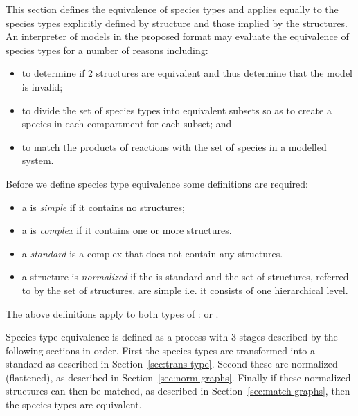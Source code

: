 \documentclass{cekarticle}
\begin{document}
This section defines the equivalence of species types and applies
equally to the species types explicitly defined by
 structure and those implied by the
 structures.  An interpreter of models in the
proposed format may evaluate the equivalence of species types for
a number of reasons including:

\begin{itemize}

\item to determine if 2  structures are equivalent
and thus determine that the model is invalid;

\item to divide the set of species types into equivalent subsets
so as to create a species in each compartment for each subset; and

\item to match the products of reactions with the set of species
in a modelled system.

\end{itemize}

Before we define species type equivalence some definitions are
required:

\begin{itemize}

\item a  is \emph{simple} if it contains no
 structures;

\item a  is \emph{complex} if it contains one
or more  structures.

\item a \emph{standard}  is a complex
 that does not contain any 
structures.

\item a  structure is \emph{normalized} if the
 is standard and the set of
 structures, referred to by the set of
 structures, are simple i.e. it
consists of one hierarchical level.

\end{itemize}

The above definitions apply to both types of :
 or .

Species type equivalence is defined as a process with 3 stages
described by the following sections in order.  First the species
types are transformed into a standard  as
described in Section~\ref{sec:trans-type}. Second these
 are normalized (flattened), as described in
Section~\ref{sec:norm-graphs}. Finally if these normalized
structures can then be matched, as described in
Section~\ref{sec:match-graphs}, then the species types are
equivalent.
\end{document}
